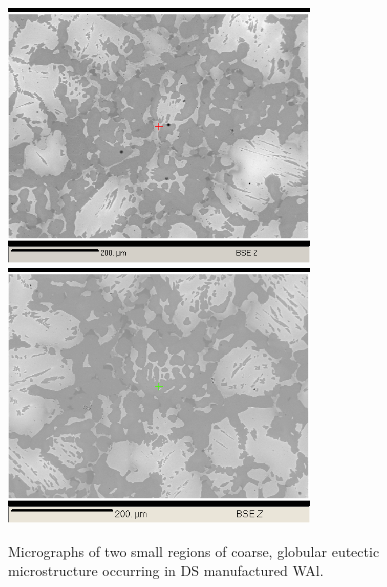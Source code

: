 \begin{figure}[htbp]
\begin{center}
\includegraphics[width=8cm]{sanWAli}
\includegraphics[width=8cm]{manual_16i}
\caption{Micrographs of two small regions of coarse, globular eutectic microstructure occurring in DS manufactured WAl.}\label{fig:sanWAli}
\end{center}
\end{figure}
%






